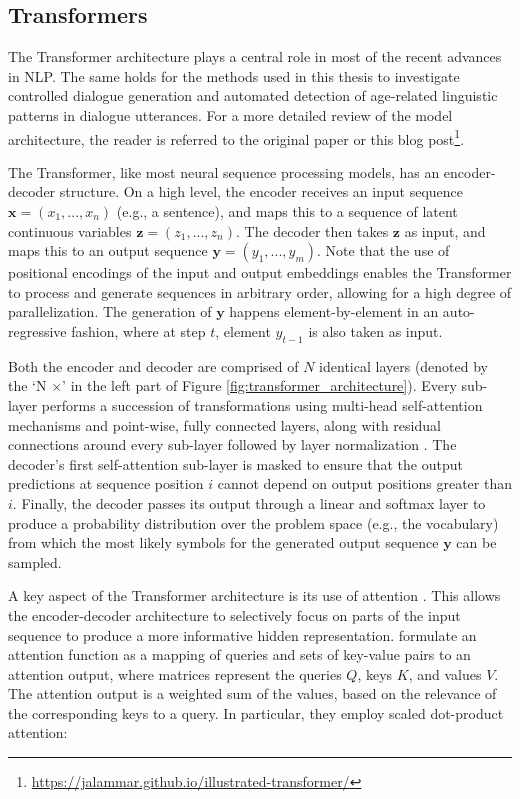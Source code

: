 \subsection{Transformers}

The Transformer architecture plays a central role in most of the recent advances in NLP. The same holds for the methods used in this thesis to investigate controlled dialogue generation and automated detection of age-related linguistic patterns in dialogue utterances. For a more detailed review of the model architecture, the reader is referred to the original paper \citep{vaswani2017attention} or this blog post\footnote{\url{https://jalammar.github.io/illustrated-transformer/}}.

The Transformer, like most neural sequence processing models, has an encoder-decoder structure. On a high level, the encoder receives an input sequence $\textbf{x} = (x_1, ..., x_n)$ (e.g., a sentence), and maps this to a sequence of latent continuous variables $\textbf{z} = (z_1, ..., z_n)$. The decoder then takes $\textbf{z}$ as input, and maps this to an output sequence $\textbf{y} = (y_1, ..., y_m)$. Note that the use of positional encodings of the input and output embeddings enables the Transformer to process and generate sequences in arbitrary order, allowing for a high degree of parallelization. The generation of $\textbf{y}$ happens element-by-element in an auto-regressive fashion, where at step $t$, element $y_{t - 1}$ is also taken as input.

Both the encoder and decoder are comprised of $N$ identical layers (denoted by the `N $\times$' in the left part of Figure \ref{fig:transformer_architecture}). Every sub-layer performs a succession of transformations using multi-head self-attention mechanisms and point-wise, fully connected layers, along with residual connections \citep{he2016residual} around every sub-layer followed by layer normalization \citep{DBLP:journals/corr/BaKH16}. The decoder's first self-attention sub-layer is masked to ensure that the output predictions at sequence position $i$ cannot depend on output positions greater than $i$. Finally, the decoder passes its output through a linear and softmax layer to produce a probability distribution over the problem space (e.g., the vocabulary) from which the most likely symbols for the generated output sequence $\textbf{y}$ can be sampled.

A key aspect of the Transformer architecture is its use of attention \citep{DBLP:journals/corr/BahdanauCB14}. This allows the encoder-decoder architecture to selectively focus on parts of the input sequence to produce a more informative hidden representation. \cite{vaswani2017attention} formulate an attention function as a mapping of queries and sets of key-value pairs to an attention output, where matrices represent the queries $Q$, keys $K$, and values $V$. The attention output is a weighted sum of the values, based on the relevance of the corresponding keys to a query. In particular, they employ scaled dot-product attention:


